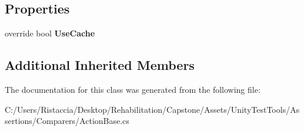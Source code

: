 \subsection*{Properties}
\begin{DoxyCompactItemize}
\item 
\mbox{\label{class_unity_test_1_1_action_base_generic_a580078becbce90a4bca72c10b8315963}} 
override bool {\bfseries Use\+Cache}
\end{DoxyCompactItemize}
\subsection*{Additional Inherited Members}


The documentation for this class was generated from the following file\+:\begin{DoxyCompactItemize}
\item 
C\+:/\+Users/\+Ristaccia/\+Desktop/\+Rehabilitation/\+Capstone/\+Assets/\+Unity\+Test\+Tools/\+Assertions/\+Comparers/Action\+Base.\+cs\end{DoxyCompactItemize}
